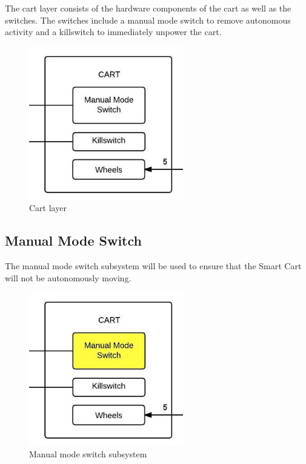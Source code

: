 The cart layer consists of the hardware components of the cart as well as the switches. The switches include a manual mode switch to remove autonomous activity and a killswitch to immediately unpower the cart.

\begin{figure}[h!]
	\centering
 	\includegraphics[width=0.60\textwidth]{images/cart}
 \caption{Cart layer}
\end{figure}

\subsection{Manual Mode Switch}
The manual mode switch subsystem will be used to ensure that the Smart Cart will not be autonomously moving.

\begin{figure}[h!]
	\centering
 	\includegraphics[width=0.60\textwidth]{images/cart_manual}
 \caption{Manual mode switch subsystem}
\end{figure}

